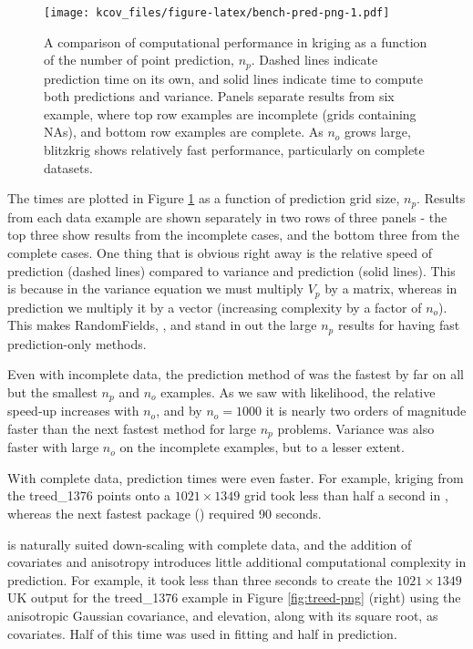 \begin{figure}
\centering
\texttt{[image: kcov\_files/figure-latex/bench-pred-png-1.pdf]}
\caption{\label{fig:bench-pred-png}A comparison of computational performance in kriging as a function of the number of point prediction, \(n_p\). Dashed lines indicate prediction time on its own, and solid lines indicate time to compute both predictions and variance. Panels separate results from six example, where top row examples are incomplete (grids containing NAs), and bottom row examples are complete. As \(n_o\) grows large, blitzkrig shows relatively fast performance, particularly on complete datasets.}
\end{figure}

The times are plotted in Figure \ref{fig:bench-pred-png} as a function of prediction grid size, \(n_p\). Results from each data example are shown separately in two rows of three panels - the top three show results from the incomplete cases, and the bottom three from the complete cases. One thing that is obvious right away is the relative speed of prediction (dashed lines) compared to variance and prediction (solid lines). This is because in the variance equation we must multiply \(V_p\) by a matrix, whereas in prediction we multiply it by a vector (increasing complexity by a factor of \(n_o\)). This makes RandomFields, , and  stand in out the large \(n_p\) results for having fast prediction-only methods.

Even with incomplete data, the prediction method of  was the fastest by far on all but the smallest \(n_p\) and \(n_o\) examples. As we saw with likelihood, the relative speed-up increases with \(n_o\), and by \(n_o=1000\) it is nearly two orders of magnitude faster than the next fastest method for large \(n_p\) problems. Variance was also faster with large \(n_o\) on the incomplete examples, but to a lesser extent.

With complete data, prediction times were even faster. For example, kriging from the treed\_1376 points onto a \(1021 \times 1349\) grid took less than half a second in , whereas the next fastest package () required 90 seconds.

 is naturally suited down-scaling with complete data, and the addition of covariates and anisotropy introduces little additional computational complexity in prediction. For example, it took less than three seconds to create the \(1021 \times 1349\) UK output for the treed\_1376 example in Figure \ref{fig:treed-png} (right) using the anisotropic Gaussian covariance, and elevation, along with its square root, as covariates. Half of this time was used in fitting and half in prediction.


